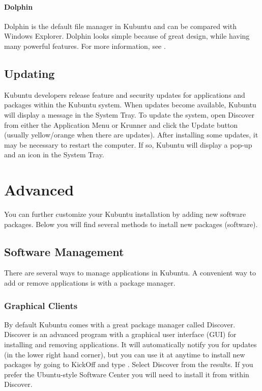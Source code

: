 \documentclass[letterpaper,10pt,english]{sphinxmanual}
\begin{document}
\subsubsection{Dolphin}
\label{\detokenize{docs/basic:dolphin}}
Dolphin is the default file manager in Kubuntu and can be compared with Windows Explorer. Dolphin looks simple because of great design, while having many powerful features. For more information, see .


\section{Updating}
\label{\detokenize{docs/basic:updating}}
Kubuntu developers release feature and security updates for applications and packages within the Kubuntu system. When updates become available, Kubuntu will display a message in the System Tray. To update the system, open Discover from either the Application Menu or Krunner and click the Update button (usually yellow/orange when there are updates). After installing some updates, it may be necessary to restart the computer. If so, Kubuntu will display a pop-up and an icon in the System Tray.

\noindent{}

{\hyperref[\detokenize{docs/basic:basic}]{}}


\chapter{Advanced}
\label{\detokenize{docs/advanced::doc}}\label{\detokenize{docs/advanced:advanced}}\label{\detokenize{docs/advanced:advanced-link}}
You can further customize your Kubuntu installation by adding new software packages. Below you will find several methods to install new packages (software).


\section{Software Management}
\label{\detokenize{docs/advanced:software-management}}
There are several ways to manage applications in Kubuntu. A convenient way to add or remove applications is with a package manager.


\subsection{Graphical Clients}
\label{\detokenize{docs/advanced:graphical-clients}}
By default Kubuntu comes with a great package manager called Discover. Discover is an advanced program with a graphical user interface (GUI) for installing and removing applications. It will automatically notify you for updates (in the lower right hand corner), but you can use it at anytime to install new packages by going to KickOff and type . Select  Discover from the results. If you prefer the Ubuntu-style \sphinxquotedblleft{}Software Center\sphinxquotedblright{} you will need to install it from within Discover.
\end{document}
